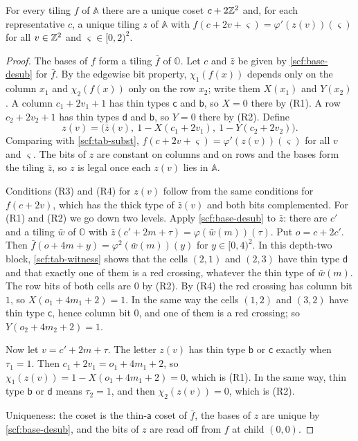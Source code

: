 \begin{lemma}\label{scf:ruler-desub}
For every tiling $f$ of $\mathbb A$ there are a unique coset $c+2\mathbb{Z}^2$ and, for each representative $c$, a unique tiling $z$ of $\mathbb A$ with $f(c+2v+\varsigma)=\varphi'(z(v))(\varsigma)$ for all $v\in\mathbb{Z}^2$ and $\varsigma\in[0,2)^2$.
\end{lemma}

\begin{proof}
The bases of $f$ form a tiling $\bar f$ of $\mathbb O$. Let $c$ and $\bar z$ be given by \cref{scf:base-desub} for $\bar f$. By the edgewise bit property, $\chi_1(f(x))$ depends only on the column $x_1$ and $\chi_2(f(x))$ only on the row $x_2$; write them $X(x_1)$ and $Y(x_2)$. A column $c_1+2v_1+1$ has thin types $\mathsf c$ and $\mathsf b$, so $X=0$ there by (R1). A row $c_2+2v_2+1$ has thin types $\mathsf d$ and $\mathsf b$, so $Y=0$ there by (R2). Define
\[
z(v)=\bigl(\bar z(v),\ 1-X(c_1+2v_1),\ 1-Y(c_2+2v_2)\bigr).
\]
Comparing with \cref{scf:tab-subst}, $f(c+2v+\varsigma)=\varphi'(z(v))(\varsigma)$ for all $v$ and $\varsigma$. The bits of $z$ are constant on columns and on rows and the bases form the tiling $\bar z$, so $z$ is legal once each $z(v)$ lies in $\mathbb A$.

Conditions (R3) and (R4) for $z(v)$ follow from the same conditions for $f(c+2v)$, which has the thick type of $\bar z(v)$ and both bits complemented. For (R1) and (R2) we go down two levels. Apply \cref{scf:base-desub} to $\bar z$: there are $c'$ and a tiling $\bar w$ of $\mathbb O$ with $\bar z(c'+2m+\tau)=\varphi(\bar w(m))(\tau)$. Put $o=c+2c'$. Then $\bar f(o+4m+y)=\varphi^2(\bar w(m))(y)$ for $y\in[0,4)^2$. In this depth-two block, \cref{scf:tab-witness} shows that the cells $(2,1)$ and $(2,3)$ have thin type $\mathsf d$ and that exactly one of them is a red crossing, whatever the thin type of $\bar w(m)$. The row bits of both cells are $0$ by (R2). By (R4) the red crossing has column bit $1$, so $X(o_1+4m_1+2)=1$. In the same way the cells $(1,2)$ and $(3,2)$ have thin type $\mathsf c$, hence column bit $0$, and one of them is a red crossing; so $Y(o_2+4m_2+2)=1$.

Now let $v=c'+2m+\tau$. The letter $z(v)$ has thin type $\mathsf b$ or $\mathsf c$ exactly when $\tau_1=1$. Then $c_1+2v_1=o_1+4m_1+2$, so $\chi_1(z(v))=1-X(o_1+4m_1+2)=0$, which is (R1). In the same way, thin type $\mathsf b$ or $\mathsf d$ means $\tau_2=1$, and then $\chi_2(z(v))=0$, which is (R2).

Uniqueness: the coset is the thin-$\mathsf a$ coset of $\bar f$, the bases of $z$ are unique by \cref{scf:base-desub}, and the bits of $z$ are read off from $f$ at child $(0,0)$.
\end{proof}

